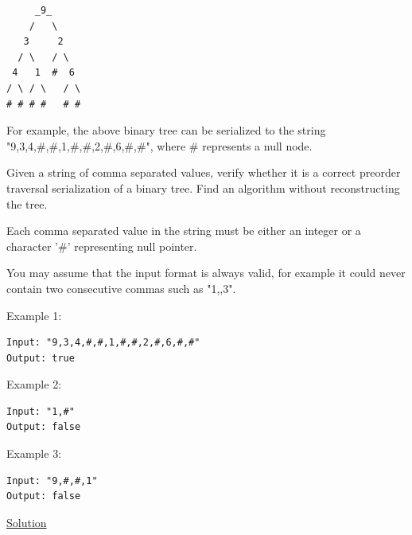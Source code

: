 \documentclass[11pt]{article}
\begin{document}
\begin{verbatim}
     _9_
    /   \
   3     2
  / \   / \
 4   1  #  6
/ \ / \   / \
# # # #   # #
\end{verbatim}

For example, the above binary tree can be serialized to the string
"9,3,4,\#,\#,1,\#,\#,2,\#,6,\#,\#", where \# represents a null node.

Given a string of comma separated values, verify whether it is a correct
preorder traversal serialization of a binary tree. Find an algorithm
without reconstructing the tree.

Each comma separated value in the string must be either an integer or a
character '\#' representing null pointer.

You may assume that the input format is always valid, for example it
could never contain two consecutive commas such as "1,,3".

Example 1:

\begin{verbatim}
Input: "9,3,4,#,#,1,#,#,2,#,6,#,#"
Output: true
\end{verbatim}

Example 2:

\begin{verbatim}
Input: "1,#"
Output: false
\end{verbatim}

Example 3:

\begin{verbatim}
Input: "9,#,#,1"
Output: false
\end{verbatim}

\href{https://blog.csdn.net/fuxuemingzhu/article/details/79537797}{Solution}
\end{document}
